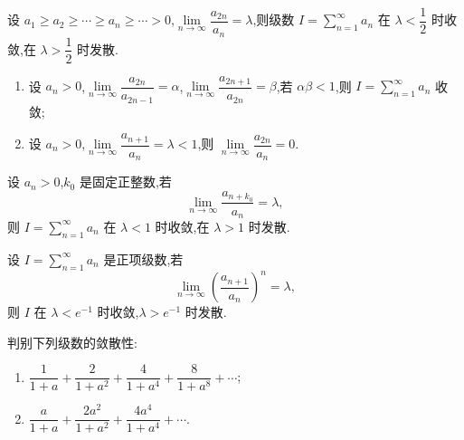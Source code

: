 \documentclass[../数学分析培优讲义.tex]{subfiles}
\begin{document}
\begin{example}
设 $a_1\geq a_2\geq\cdots\geq a_n\geq\cdots>0$,$\displaystyle\lim\limits_{n\to\infty}\dfrac{a_{2n}}{a_n}=\lambda$,则级数 $\displaystyle I=\sum\limits_{n=1}^{\infty}a_n$ 在 $\lambda<\dfrac{1}{2}$ 时收敛,在 $\lambda>\dfrac{1}{2}$ 时发散.
\end{example}
\exampleblank

\begin{example}
\begin{enumerate}[label=(\arabic*)]
    \item 设 $a_n>0$,$\displaystyle\lim\limits_{n\to\infty}\dfrac{a_{2n}}{a_{2n-1}}=\alpha$,$\displaystyle\lim\limits_{n\to\infty}\dfrac{a_{2n+1}}{a_{2n}}=\beta$,若 $\alpha\beta<1$,则 $\displaystyle I=\sum\limits_{n=1}^{\infty}a_n$ 收敛;
    \item 设 $a_n>0$,$\displaystyle\lim\limits_{n\to\infty}\dfrac{a_{n+1}}{a_n}=\lambda<1$,则 $\displaystyle\lim\limits_{n\to\infty}\dfrac{a_{2n}}{a_n}=0$.
\end{enumerate}
\end{example}
\exampleblank

\begin{example}
设 $a_n>0$,$k_0$ 是固定正整数,若
\[
    \lim\limits_{n\to\infty}\dfrac{a_{n+k_0}}{a_n}=\lambda,
\]
则 $\displaystyle I=\sum\limits_{n=1}^{\infty}a_n$ 在 $\lambda<1$ 时收敛,在 $\lambda>1$ 时发散.
\end{example}
\exampleblank

\begin{example}
设 $\displaystyle I=\sum\limits_{n=1}^{\infty}a_n$ 是正项级数,若
\[
    \lim\limits_{n\to\infty}\left(\dfrac{a_{n+1}}{a_n}\right)^n=\lambda,
\]
则 $I$ 在 $\lambda<e^{-1}$ 时收敛,$\lambda>e^{-1}$ 时发散.
\end{example}
\exampleblank

\begin{example}
判别下列级数的敛散性:
\begin{enumerate}[label=(\arabic*)]
    \item $\displaystyle\dfrac{1}{1+a}+\dfrac{2}{1+a^2}+\dfrac{4}{1+a^4}+\dfrac{8}{1+a^8}+\cdots$;
    \item $\displaystyle\dfrac{a}{1+a}+\dfrac{2a^2}{1+a^2}+\dfrac{4a^4}{1+a^4}+\cdots$.
\end{enumerate}
\end{example}
\exampleblank


\newpage

\end{document}
